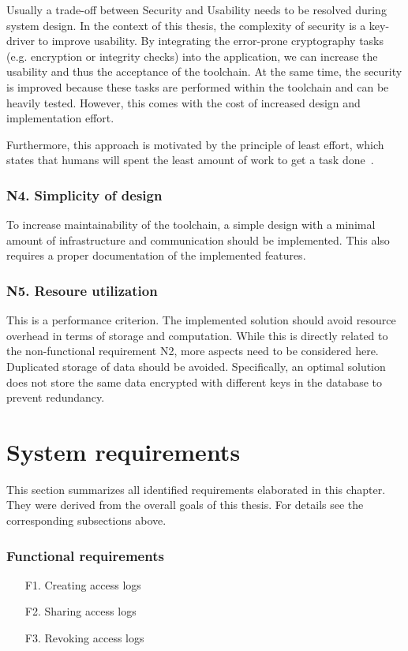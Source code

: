 \documentclass[../main.tex]{subfiles}
\begin{document}
Usually a trade-off between Security and Usability needs to be resolved during system design.
In the context of this thesis, the complexity of security is a key-driver to improve usability. 
By integrating the error-prone cryptography tasks (e.g. encryption or integrity checks) into the application, we can increase the usability and thus the acceptance of the toolchain.
At the same time, the security is improved because these tasks are performed within the toolchain and can be heavily tested.
However, this comes with the cost of increased design and implementation effort.

Furthermore, this approach is motivated by the principle of least effort, which states that humans will spent the least amount of work to get a task done~\cite{Levenson2018}.

\subsubsection{N4. Simplicity of design}
To increase maintainability of the toolchain, a simple design with a minimal amount of infrastructure and communication should be implemented.
This also requires a proper documentation of the implemented features.

\subsubsection{N5. Resoure utilization}
This is a performance criterion.
The implemented solution should avoid resource overhead in terms of storage and computation.
While this is directly related to the non-functional requirement N2, more aspects need to be considered here.
Duplicated storage of data should be avoided.
Specifically, an optimal solution does not store the same data encrypted with different keys in the database to prevent redundancy.


\section{System requirements}\label{system-requriements}
This section summarizes all identified requirements elaborated in this chapter.
They were derived from the overall goals of this thesis.
For details see the corresponding subsections above.

\subsubsection{Functional requirements}
\begin{itemize}
    \item [F1.] Creating access logs
    \item [F2.] Sharing access logs
    \item [F3.] Revoking access logs
\end{itemize}
\end{document}
